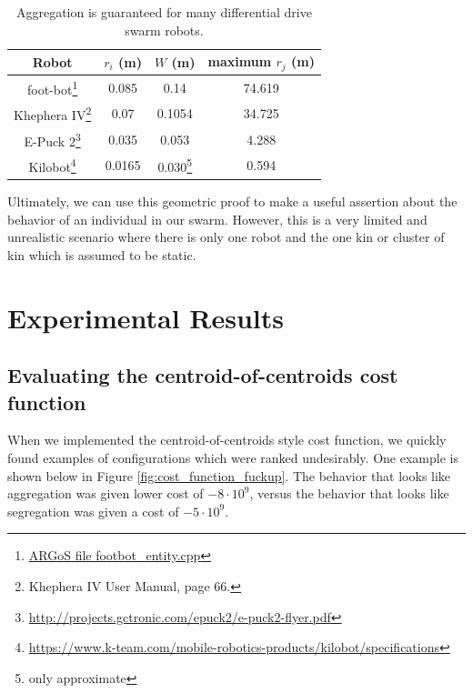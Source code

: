 \documentclass[conference]{IEEEtran}
\begin{document}
    \begin{savenotes}
    \begin{table}
      \centering
      \caption{Aggregation is guaranteed for many differential drive swarm robots.}
      \begin{tabular}{|c|c|c|c|} \hline
        Robot & $r_i$ (m) & $W$ (m) & maximum $r_j$ (m) \\ \hline
        foot-bot\footnote{\href{https://github.com/ilpincy/argos3/blob/master/src/plugins/robots/foot-bot/simulator/footbot_entity.cpp}{ARGoS file footbot\_entity.cpp}} &
            0.085 & 0.14 & 74.619 \\ \hline
        Khephera IV\footnote{Khephera IV User Manual, page 66.} &
            0.07 & 0.1054 & 34.725 \\ \hline
        E-Puck 2\footnote{\href{http://projects.gctronic.com/epuck2/e-puck2-flyer.pdf}{http://projects.gctronic.com/epuck2/e-puck2-flyer.pdf}} &
            0.035 & 0.053 & 4.288 \\ \hline
        Kilobot\footnote{\href{https://www.k-team.com/mobile-robotics-products/kilobot/specifications}{https://www.k-team.com/mobile-robotics-products/kilobot/specifications}} &
            0.0165 & 0.030\footnote{only approximate} & 0.594 \\ \hline
      \end{tabular}
      \label{table:robots}
    \end{table}
    \end{savenotes}

    Ultimately, we can use this geometric proof to make a useful assertion about the behavior of an individual in our swarm. However, this is a very limited and unrealistic scenario where there is only one robot and the one kin or cluster of kin which is assumed to be static.

\section{Experimental Results}

  \subsection{Evaluating the centroid-of-centroids cost function} \label{section:evaluting_cost_functions}

    When we implemented the centroid-of-centroids style cost function, we quickly found examples of configurations which were ranked undesirably. One example is shown below in Figure \ref{fig:cost_function_fuckup}. The behavior that looks like aggregation was given lower cost of $-8\cdot 10^{9}$, versus the behavior that looks like segregation was given a cost of $-5\cdot 10^{9}$.
\end{document}
